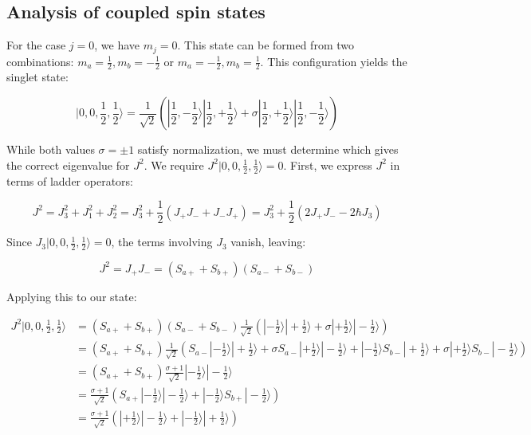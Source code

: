 \documentclass[italian]{HKNdocument}
\begin{document}
\subsection{Analysis of coupled spin states}
For the case $j=0$, we have $m_j=0$. This state can be formed from two combinations: $m_a=\frac{1}{2}, m_b=-\frac{1}{2}$ or $m_a=-\frac{1}{2}, m_b=\frac{1}{2}$. This configuration yields the singlet state:

\begin{equation}
|0,0,\frac{1}{2},\frac{1}{2}\rangle=\frac{1}{\sqrt{2}}(|\frac{1}{2},-\frac{1}{2}\rangle|\frac{1}{2},+\frac{1}{2}\rangle+\sigma|\frac{1}{2},+\frac{1}{2}\rangle|\frac{1}{2},-\frac{1}{2}\rangle)
\end{equation}

While both values $\sigma=\pm 1$ satisfy normalization, we must determine which gives the correct eigenvalue for $J^2$. We require $J^2|0,0,\frac{1}{2},\frac{1}{2}\rangle=0$. First, we express $J^2$ in terms of ladder operators:

\begin{equation}
J^{2}=J_{3}^{2}+J_{1}^{2}+J_{2}^{2}=J_{3}^{2}+\frac{1}{2}(J_{+}J_{-}+J_{-}J_{+})=J_{3}^{2}+\frac{1}{2}(2J_{+}J_{-}-2\hbar J_{3})
\end{equation}

Since $J_3|0,0,\frac{1}{2},\frac{1}{2}\rangle=0$, the terms involving $J_3$ vanish, leaving:

\begin{equation}
J^{2}=J_{+}J_{-}=(S_{a+}+S_{b+})(S_{a-}+S_{b-})
\end{equation}

Applying this to our state:

\begin{align}
J^{2}|0,0,\frac{1}{2},\frac{1}{2}\rangle &= (S_{a+}+S_{b+})(S_{a-}+S_{b-}) \frac{1}{\sqrt{2}}(|-\frac{1}{2}\rangle|+\frac{1}{2}\rangle+\sigma|+\frac{1}{2}\rangle|-\frac{1}{2}\rangle) \\
&= (S_{a+}+S_{b+}) \frac{1}{\sqrt{2}}(S_{a-}|-\frac{1}{2}\rangle|+\frac{1}{2}\rangle+\sigma S_{a-}|+\frac{1}{2}\rangle|-\frac{1}{2}\rangle+|-\frac{1}{2}\rangle S_{b-}|+\frac{1}{2}\rangle+\sigma|+\frac{1}{2}\rangle S_{b-}|-\frac{1}{2}\rangle) \\
&= (S_{a+}+S_{b+}) \frac{\sigma+1}{\sqrt{2}}|-\frac{1}{2}\rangle|-\frac{1}{2}\rangle \\
&= \frac{\sigma+1}{\sqrt{2}}(S_{a+}|-\frac{1}{2}\rangle|-\frac{1}{2}\rangle+|-\frac{1}{2}\rangle S_{b+}|-\frac{1}{2}\rangle) \\
&= \frac{\sigma+1}{\sqrt{2}}(|+\frac{1}{2}\rangle|-\frac{1}{2}\rangle+|-\frac{1}{2}\rangle|+\frac{1}{2}\rangle)
\end{align}
\end{document}

